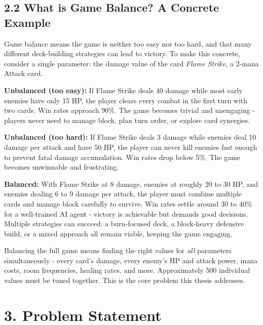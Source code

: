 \subsection*{2.2 What is Game Balance? A Concrete Example}

Game balance means the game is neither too easy nor too hard, and that many different deck-building strategies can lead to victory. To make this concrete, consider a single parameter: the damage value of the card \textit{Flame Strike}, a 2-mana Attack card.

\textbf{Unbalanced (too easy):} If Flame Strike deals 40 damage while most early enemies have only 15 HP, the player clears every combat in the first turn with two cards. Win rates approach 90\%. The game becomes trivial and unengaging - players never need to manage block, plan turn order, or explore card synergies.

\textbf{Unbalanced (too hard):} If Flame Strike deals 3 damage while enemies deal 10 damage per attack and have 50 HP, the player can never kill enemies fast enough to prevent fatal damage accumulation. Win rates drop below 5\%. The game becomes unwinnable and frustrating.

\textbf{Balanced:} With Flame Strike at 8 damage, enemies at roughly 20 to 30 HP, and enemies dealing 6 to 9 damage per attack, the player must combine multiple cards and manage block carefully to survive. Win rates settle around 30 to 40\% for a well-trained AI agent - victory is achievable but demands good decisions. Multiple strategies can succeed: a burn-focused deck, a block-heavy defensive build, or a mixed approach all remain viable, keeping the game engaging.

Balancing the full game means finding the right values for \textit{all} parameters simultaneously - every card's damage, every enemy's HP and attack power, mana costs, room frequencies, healing rates, and more. Approximately 500 individual values must be tuned together. This is the core problem this thesis addresses.

\section*{3. Problem Statement}

